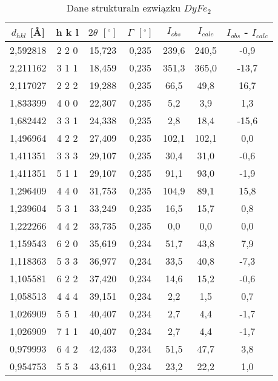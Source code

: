 \documentclass[a4paper,12pt]{article}
\numberwithin{equation}{section}
\begin{document}
\begin{appendices}

  \label{DyRentgenTab}
  \scriptsize
  \begin{longtable}[c]{|c|c|c|c|c|c|c|}
\caption{Dane strukturaln ezwiązku $DyFe_2$}\\
  \hline
  
    $d_{hkl}$ [\AA]&	h	k	l&$2\theta$ $\left[ ^{\circ}\right]$&$\Gamma$ $\left[ ^{\circ}\right]$&$I_{obs}$&$I_{calc}$	&$I_{obs}$ - $I_{calc}$	\\\hline\hline
2,592818	&	2   2   0	&	15,723	&	0,235	&	239,6	&	240,5	&	-0,9	\\\hline
2,211162	&	3   1   1	&	18,459	&	0,235	&	351,3	&	365,0	&	-13,7	\\\hline
2,117027	&	2   2   2	&	19,288	&	0,235	&	66,5	&	49,8	&	16,7	\\\hline
1,833399	&	4   0   0	&	22,307	&	0,235	&	5,2	&	3,9	&	1,3	\\\hline
1,682442	&	3   3   1	&	24,338	&	0,235	&	2,8	&	18,4	&	-15,6	\\\hline
1,496964	&	4   2   2	&	27,409	&	0,235	&	102,1	&	102,1	&	0,0	\\\hline
1,411351	&	3   3   3	&	29,107	&	0,235	&	30,4	&	31,0	&	-0,6	\\\hline
1,411351	&	5   1   1	&	29,107	&	0,235	&	91,1	&	93,0	&	-1,9	\\\hline
1,296409	&	4   4   0	&	31,753	&	0,235	&	104,9	&	89,1	&	15,8	\\\hline
1,239604	&	5   3   1	&	33,249	&	0,235	&	16,5	&	15,7	&	0,8	\\\hline
1,222266	&	4   4   2	&	33,735	&	0,235	&	0,0	&	0,0	&	0,0	\\\hline
1,159543	&	6   2   0	&	35,619	&	0,234	&	51,7	&	43,8	&	7,9	\\\hline
1,118363	&	5   3   3	&	36,977	&	0,234	&	33,5	&	40,8	&	-7,3	\\\hline
1,105581	&	6   2   2	&	37,420	&	0,234	&	14,6	&	15,2	&	-0,6	\\\hline
1,058513	&	4   4   4	&	39,151	&	0,234	&	2,2	&	1,5	&	0,7	\\\hline
1,026909	&	5   5   1	&	40,407	&	0,234	&	2,7	&	4,4	&	-1,7	\\\hline
1,026909	&	7   1   1	&	40,407	&	0,234	&	2,7	&	4,4	&	-1,7	\\\hline
0,979993	&	6   4   2	&	42,433	&	0,234	&	51,5	&	47,7	&	3,8	\\\hline
0,954753	&	5   5   3	&	43,611	&	0,234	&	23,2	&	22,2	&	1,0	\\\hline

\end{longtable}
\end{appendices}
\end{document}
